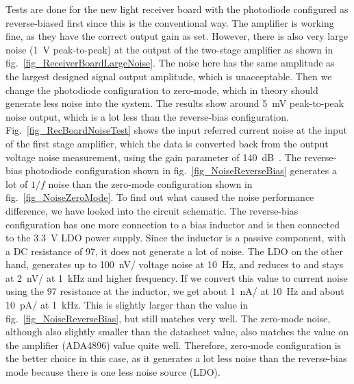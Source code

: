 Tests are done for the new light receiver board with the photodiode configured as reverse-biased first since this is the conventional way.  The amplifier is working fine, as they have the correct output gain as set.  However, there is also very large noise (\qty{1}{V} peak-to-peak) at the output of the two-stage amplifier as shown in fig.~\ref{fig_ReceiverBoardLargeNoise}.  The noise here has the same amplitude as the largest designed signal output amplitude, which is unacceptable.  Then we change the photodiode configuration to zero-mode, which in theory should generate less noise into the system.  The results show around \qty{5}{mV} peak-to-peak noise output, which is a lot less than the reverse-bias configuration.  Fig.~\ref{fig_RecBoardNoiseTest} shows the input referred current noise at the input of the first stage amplifier, which the data is converted back from the output voltage noise measurement, using the gain parameter of \qty{140}{dB\Omega}.  The reverse-bias photodiode configuration shown in fig.~\ref{fig_NoiseReverseBias} generates a lot of $1/f$ noise than the zero-mode configuration shown in fig.~\ref{fig_NoiseZeroMode}.  To find out what caused the noise performance difference, we have looked into the circuit schematic.  The reverse-bias configuration has one more connection to a bias inductor and is then connected to the \qty{3.3}{V} LDO power supply.  Since the inductor is a passive component, with a DC resistance of \qty{97}{\Omega}, it does not generate a lot of noise.  The LDO on the other hand, generates up to \qty{100}{nV/\sqrthz} voltage noise at \qty{10}{Hz}, and reduces to and stays at \qty{2}{nV/\sqrthz} at \qty{1}{kHz} and higher frequency.  If we convert this value to current noise using the \qty{97}{\Omega} resistance at the inductor, we get about \qty{1}{nA/\sqrthz} at \qty{10}{Hz} and about \qty{10}{pA/\sqrthz} at \qty{1}{kHz}.  This is slightly larger than the value in fig.~\ref{fig_NoiseReverseBias}, but still matches very well.  The zero-mode noise, although also slightly smaller than the datasheet value, also matches the value on the amplifier (ADA4896) value quite well.  Therefore, zero-mode configuration is the better choice in this case, as it generates a lot less noise than the reverse-bias mode because there is one less noise source (LDO).


